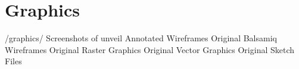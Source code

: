 \section{Graphics}

\begin{FileList}{/graphics/}
 Screenshots of unveil %
  Annotated Wireframes%
 Original Balsamiq Wireframes%
 Original Raster Graphics %
 Original Vector Graphics %
 Original Sketch Files %
\end{FileList}

